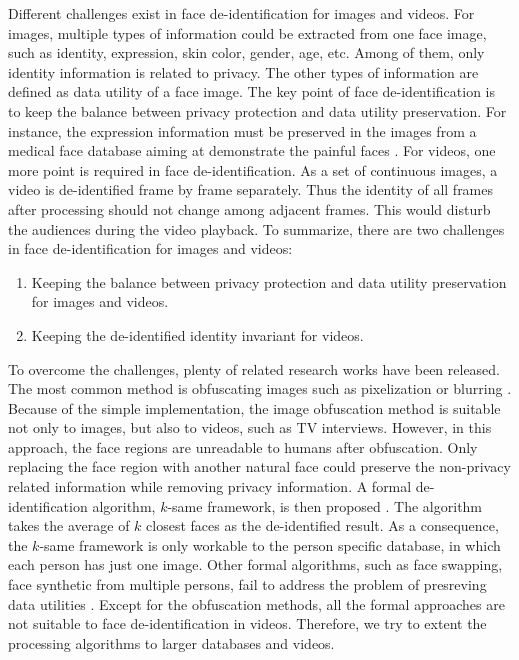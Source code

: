 Different challenges exist in face de-identification for images and videos. For 
images, multiple types of information could be extracted from one face image, such as
identity, expression, skin color, gender, age, etc. Among of them, only identity
information is related to privacy. The other types of information are defined
as data utility of a face image. The key point of face de-identification is to
keep the balance between privacy protection and data utility preservation. For
instance, the expression information must be preserved in the images from a medical 
face database aiming at demonstrate the painful faces \cite{mediDB09}. For videos,
one more point is required in face de-identification. As a set of continuous
images, a video is de-identified frame by frame separately. Thus the identity
of all frames after processing should not change among adjacent frames. 
This would disturb the audiences during the video playback. To summarize,
there are two challenges in face de-identification for images and videos:
\begin{enumerate}
	\item Keeping the balance between privacy protection and data utility 
		  preservation for images and videos.
	\item Keeping the de-identified identity invariant for videos.
\end{enumerate}

To overcome the challenges, plenty of related research works have been released. 
The most common method is obfuscating images such as pixelization or blurring 
\cite{Boyle00,Agrawal09}. Because of the simple implementation, the image 
obfuscation method is suitable not only to images, but also to videos, such 
as TV interviews. However, in this approach, the face regions are unreadable 
to humans after obfuscation. Only replacing the 
face region with another natural face could preserve the non-privacy related 
information while removing privacy information. A formal de-identification
algorithm, $k$-same framework, is then proposed \cite{Newton05,Ralph05,Gross08}. 
The algorithm takes the average of $k$ closest faces as the de-identified result. 
As a consequence, the $k$-same framework is only workable to the person specific 
database, in which each person has just one image. Other formal algorithms, such 
as face swapping, face synthetic from multiple persons, fail to address the 
problem of presreving data utilities \cite{swap08,Mosa14}. Except for the
obfuscation methods, all the formal approaches are not suitable to face
de-identification in videos. Therefore, we try to extent the processing 
algorithms to larger databases and videos. 

